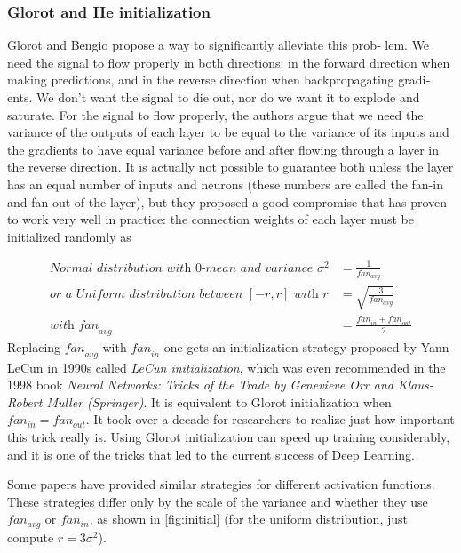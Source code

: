 \documentclass[12pt, letterpaper]{article}
\theoremstyle{definition}
\let\ti\textit
\begin{document}
\subsubsection{Glorot and He initialization}
Glorot and Bengio propose a way to significantly alleviate this prob‐ lem. We need the signal to flow properly in both directions: in the forward direction when making predictions, and in the reverse direction when backpropagating gradi‐ ents. We don’t want the signal to die out, nor do we want it to explode and saturate. For the signal to flow properly, the authors argue that we need the variance of the outputs of each layer to be equal to the variance of its inputs and the gradients to have equal variance before and after flowing through a layer in the reverse direction. It is actually not possible to guarantee both unless the layer has an equal number of inputs and neurons (these numbers are called the fan-in and fan-out of the layer), but they proposed a good compromise that has proven to work very well in practice: the connection weights of each layer must be initialized randomly as

\begin{equation}
\begin{aligned}
\textit{Normal distribution with $0$-mean and variance } \sigma^2 &= \frac{1}{fan_{avg}}\\
\textit{or a Uniform distribution between $[-r, r]$ with } r &= \sqrt{\frac{3}{fan_{avg}}}\\
\textit{with} \textit{ fan}_{avg} &=\frac{\textit{fan}_{in} + \textit{fan}_{out}}{2}
\end{aligned}
\end{equation}
Replacing $\textit{fan}_{avg}$ with $\textit{fan}_{in}$ one gets an initialization strategy proposed by Yann LeCun in 1990s called \ti{LeCun initialization}, which was even recommended in the 1998 book \ti{Neural Networks: Tricks of the Trade by Genevieve Orr and Klaus-Robert Muller (Springer)}. It is equivalent to Glorot initialization when $fan_{in} = fan_{out}$. It took over a decade for researchers to realize just how important this trick really is. Using Glorot initialization can speed up training considerably, and it is one of the tricks that led to the current success of Deep Learning.

Some papers have provided similar strategies for different activation functions. These strategies differ only by the scale of the variance and whether they use $fan_{avg}$ or $fan_{in}$, as shown in \autoref{fig:initial} (for the uniform distribution, just compute $r = 3\sigma^2$). 
\end{document}
